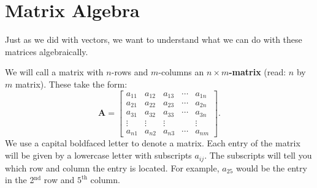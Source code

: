         \section{Matrix Algebra}
        Just as we did with vectors, we want to understand what we can do with these matrices algebraically.  
        
        We will call a matrix with $n$-rows and $m$-columns an \textbf{$n\times m$-matrix} (read: $n$ by $m$ matrix).  These take the form:
        \[\mathbf{A}=
        \begin{bmatrix}
        a_{11} & a_{12} & a_{13} & \cdots & a_{1n}\\
        a_{21} & a_{22} & a_{23} & \cdots & a_{2n}\\
        a_{31} & a_{32} & a_{33} & \cdots & a_{3n}\\
        \vdots & \vdots & \vdots & & \vdots \\
        a_{n1} & a_{n2} & a_{n3} & \cdots & a_{nm}
        \end{bmatrix}.
        \]
        We use a capital boldfaced letter to denote a matrix. Each entry of the matrix will be given by a lowercase letter with subscripts $a_{ij}$.  The subscripts will tell you which row and column the entry is located. For example, $a_{25}$ would be the entry in the 2$^\textrm{nd}$ row and $5^\textrm{th}$ column.
        
